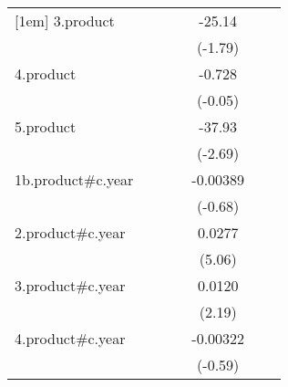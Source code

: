 {\begin{tabular}{l*{6}{c}}
[1em]
3.product           &                     &                     &                     &      -25.14         &                     &                     \\
                    &                     &                     &                     &     (-1.79)         &                     &                     \\
[1em]
4.product           &                     &                     &                     &      -0.728         &                     &                     \\
                    &                     &                     &                     &     (-0.05)         &                     &                     \\
[1em]
5.product           &                     &                     &                     &      -37.93\sym{**} &                     &                     \\
                    &                     &                     &                     &     (-2.69)         &                     &                     \\
[1em]
1b.product#c.year   &                     &                     &                     &    -0.00389         &                     &                     \\
                    &                     &                     &                     &     (-0.68)         &                     &                     \\
[1em]
2.product#c.year    &                     &                     &                     &      0.0277\sym{***}&                     &                     \\
                    &                     &                     &                     &      (5.06)         &                     &                     \\
[1em]
3.product#c.year    &                     &                     &                     &      0.0120\sym{*}  &                     &                     \\
                    &                     &                     &                     &      (2.19)         &                     &                     \\
[1em]
4.product#c.year    &                     &                     &                     &    -0.00322         &                     &                     \\
                    &                     &                     &                     &     (-0.59)         &                     &                     \\

\end{tabular}}
